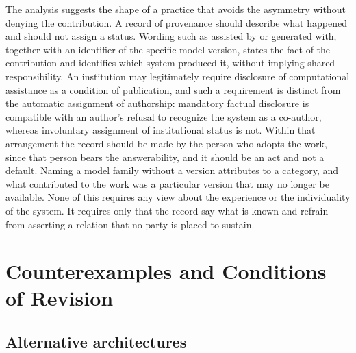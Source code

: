 \documentclass[12pt]{article}
\theoremstyle{definition}
\theoremstyle{plain}
\begin{document}
The analysis suggests the shape of a practice that avoids the asymmetry without denying the contribution. A record of provenance should describe what happened and should not assign a status. Wording such as assisted by or generated with, together with an identifier of the specific model version, states the fact of the contribution and identifies which system produced it, without implying shared responsibility. An institution may legitimately require disclosure of computational assistance as a condition of publication, and such a requirement is distinct from the automatic assignment of authorship: mandatory factual disclosure is compatible with an author's refusal to recognize the system as a co-author, whereas involuntary assignment of institutional status is not. Within that arrangement the record should be made by the person who adopts the work, since that person bears the answerability, and it should be an act and not a default. Naming a model family without a version attributes to a category, and what contributed to the work was a particular version that may no longer be available. None of this requires any view about the experience or the individuality of the system. It requires only that the record say what is known and refrain from asserting a relation that no party is placed to sustain.

\section{Counterexamples and Conditions of Revision}

\subsection{Alternative architectures}
\end{document}

